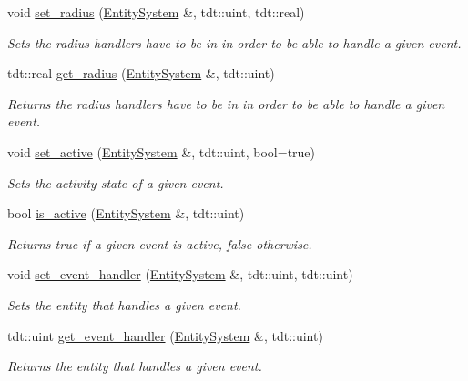 \begin{DoxyCompactItemize}
void \hyperlink{namespace_event_helper_a906fcd38a55caae4e1257103541c2e4a}{set\+\_\+radius} (\hyperlink{class_entity_system}{Entity\+System} \&, tdt\+::uint, tdt\+::real)
\begin{DoxyCompactList}\small\item\em Sets the radius handlers have to be in in order to be able to handle a given event. \end{DoxyCompactList}\item 
tdt\+::real \hyperlink{namespace_event_helper_a9ef199012ea07f5bbe0301d9667ff9a9}{get\+\_\+radius} (\hyperlink{class_entity_system}{Entity\+System} \&, tdt\+::uint)
\begin{DoxyCompactList}\small\item\em Returns the radius handlers have to be in in order to be able to handle a given event. \end{DoxyCompactList}\item 
void \hyperlink{namespace_event_helper_a3cb82954b8151842a031634e51256892}{set\+\_\+active} (\hyperlink{class_entity_system}{Entity\+System} \&, tdt\+::uint, bool=true)
\begin{DoxyCompactList}\small\item\em Sets the activity state of a given event. \end{DoxyCompactList}\item 
bool \hyperlink{namespace_event_helper_a8ceaf38d47d92b6a755f62220c5e2060}{is\+\_\+active} (\hyperlink{class_entity_system}{Entity\+System} \&, tdt\+::uint)
\begin{DoxyCompactList}\small\item\em Returns true if a given event is active, false otherwise. \end{DoxyCompactList}\item 
void \hyperlink{namespace_event_helper_a0660bda6d3e7783f48f606449fe3d3e3}{set\+\_\+event\+\_\+handler} (\hyperlink{class_entity_system}{Entity\+System} \&, tdt\+::uint, tdt\+::uint)
\begin{DoxyCompactList}\small\item\em Sets the entity that handles a given event. \end{DoxyCompactList}\item 
tdt\+::uint \hyperlink{namespace_event_helper_adee82f39fa2d8aad3d124530b3f5ee76}{get\+\_\+event\+\_\+handler} (\hyperlink{class_entity_system}{Entity\+System} \&, tdt\+::uint)
\begin{DoxyCompactList}\small\item\em Returns the entity that handles a given event. \end{DoxyCompactList}\end{DoxyCompactItemize}


